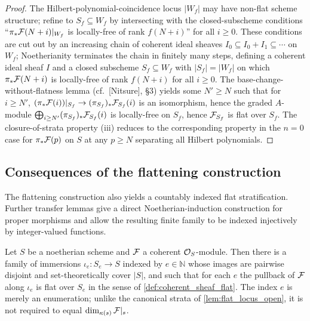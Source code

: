 \begin{proof}
  The Hilbert-polynomial-coincidence locus \(|W_f|\) may have non-flat scheme
  structure; refine to \(S_f \subseteq W_f\) by intersecting with the
  closed-subscheme conditions ``\(\pi_* \mathcal{F}(N+i)|_{W_f}\) is locally-free of rank
  \(f(N+i)\)'' for all \(i \ge 0\).  These conditions are cut out by an increasing
  chain of coherent ideal sheaves \(I_0 \subseteq I_0 + I_1 \subseteq \cdots\) on
  \(W_f\); Noetherianity terminates the chain in finitely many steps, defining a
  coherent ideal sheaf \(I\) and a closed subscheme \(S_f \subseteq W_f\) with
  \(|S_f| = |W_f|\) on which \(\pi_* \mathcal{F}(N+i)\) is locally-free of rank \(f(N+i)\)
  for all \(i \ge 0\). The base-change-without-flatness lemma (cf.\ [Nitsure],
  \S3) yields some \(N' \ge N\) such that for \(i \ge N'\),
  \((\pi_* \mathcal{F}(i))|_{S_f} \to (\pi_{S_f})_* \mathcal{F}_{S_f}(i)\) is an isomorphism, hence
  the graded \(A\)-module \(\bigoplus_{i \ge N'} (\pi_{S_f})_* \mathcal{F}_{S_f}(i)\) is
  locally-free on \(S_f\), hence \(\mathcal{F}_{S_f}\) is flat over \(S_f\). The
  closure-of-strata property (iii) reduces to the corresponding property in
  the \(n=0\) case for \(\pi_* \mathcal{F}(p)\) on \(S\) at any \(p \ge N\) separating all
  Hilbert polynomials.
\end{proof}

\subsection{Consequences of the flattening construction}
\label{sec:flatstrat_lean_helpers}

The flattening construction also yields a countably indexed flat
stratification.  Further transfer lemmas give a direct Noetherian-induction
construction for proper morphisms and allow the resulting finite family to
be indexed injectively by integer-valued functions.

\begin{lemma}[Flat-locus stratification, special case \(n = 0\)]\leanok
  \label{lem:flat_locus_stratification_lean}
  Let \(S\) be a noetherian scheme and \(\mathcal{F}\) a coherent \(\mathcal{O}_S\)-module.
  Then there is a family of immersions \(\iota_e : S_e \to S\) indexed by
  \(e \in \mathbb{N}\) whose images are pairwise disjoint and set-theoretically
  cover \(|S|\), and such that for each \(e\) the pullback of \(\mathcal{F}\) along
  \(\iota_e\) is flat over \(S_e\) in the sense of
  \cref{def:coherent_sheaf_flat}.  The index \(e\) is merely an enumeration;
  unlike the canonical strata of \cref{lem:flat_locus_open}, it is not
  required to equal \(\dim_{\kappa(s)} \mathcal{F}|_s\).
\end{lemma}

